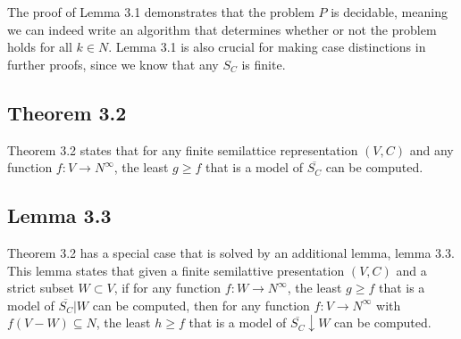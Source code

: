The proof of Lemma 3.1 demonstrates that the problem $P$
is decidable, meaning we can indeed write an algorithm that
determines whether or not the problem holds for all $k \in N$.
Lemma 3.1 is also crucial for making case distinctions
in further proofs, since we know that any $S_C$ is finite.

\subsection{Theorem 3.2}
\label{ssec:theorem_3_2}

Theorem 3.2 states that for any finite semilattice representation
$(V, C)$ and any function $f : V \rightarrow N^{\infty}$,
the least $g \ge f$ that is a model of $\overline{S_C}$ can be computed.
\cite[p.~3]{mbezem}

\subsection{Lemma 3.3}
\label{ssec:lemma_3_3}

Theorem 3.2 has a special case that is solved by an additional lemma,
lemma 3.3. This lemma states that given a finite semilattive presentation
$(V, C)$ and a strict subset $W \subset V$, if for any function
$f : W \rightarrow N^{\infty}$, the least $g \ge f$ that is a model of
$\overline{S_C}|W$ can be computed, then for any function
$f : V \rightarrow N^{\infty}$ with $f(V - W) \subseteq N$,
the least $h \ge f$ that is a model of $\overline{S_C}\downarrow W$ can be computed.
\cite[p.~3-4]{mbezem}
